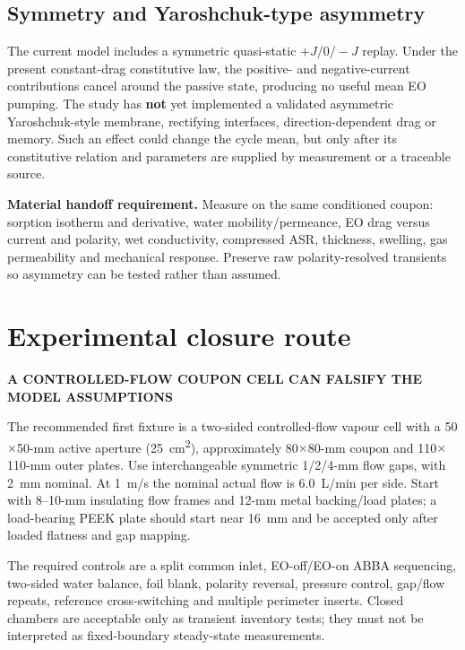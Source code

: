 \documentclass[10pt,a4paper]{article}
\newcommand{\sans}{\fontfamily{qhv}\selectfont}
\newcommand{\eyebrow}[1]{{\sans\bfseries\color{Teal}\MakeUppercase{#1}}\par\vspace{1.5mm}}
\begin{document}
\subsection{Symmetry and Yaroshchuk-type asymmetry}

The current model includes a symmetric quasi-static $+J/0/-J$ replay. Under
the present constant-drag constitutive law, the positive- and negative-current
contributions cancel around the passive state, producing no useful mean EO
pumping. The study has \textbf{not} yet implemented a validated asymmetric
Yaroshchuk-style membrane, rectifying interfaces, direction-dependent drag or
memory. Such an effect could change the cycle mean, but only after its
constitutive relation and parameters are supplied by measurement or a
traceable source.

\begin{mainbox}
\textbf{Material handoff requirement.} Measure on the same conditioned coupon:
sorption isotherm and derivative, water mobility/permeance, EO drag versus
current and polarity, wet conductivity, compressed ASR, thickness, swelling,
gas permeability and mechanical response. Preserve raw polarity-resolved
transients so asymmetry can be tested rather than assumed.
\end{mainbox}

\section{Experimental closure route}
\eyebrow{A controlled-flow coupon cell can falsify the model assumptions}

The recommended first fixture is a two-sided controlled-flow vapour cell with
a 50$\times$50-mm active aperture (25~cm\textsuperscript{2}), approximately
80$\times$80-mm coupon and 110$\times$110-mm outer plates. Use interchangeable
symmetric 1/2/4-mm flow gaps, with 2~mm nominal. At 1~m/s the nominal actual
flow is 6.0~L/min per side. Start with 8--10-mm insulating flow frames and
12-mm metal backing/load plates; a load-bearing PEEK plate should start near
16~mm and be accepted only after loaded flatness and gap mapping.

The required controls are a split common inlet, EO-off/EO-on ABBA sequencing,
two-sided water balance, foil blank, polarity reversal, pressure control,
gap/flow repeats, reference cross-switching and multiple perimeter inserts.
Closed chambers are acceptable only as transient inventory tests; they must
not be interpreted as fixed-boundary steady-state measurements.
\end{document}
